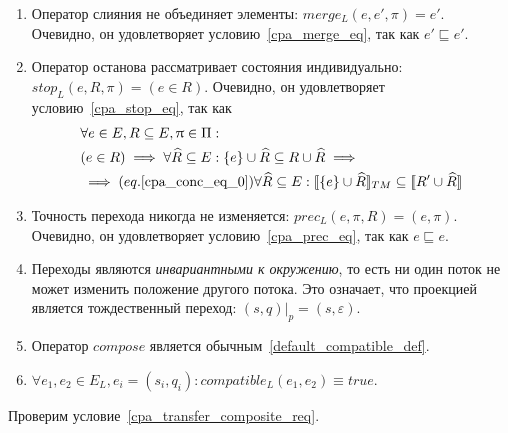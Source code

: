 \begin{enumerate}

\item Оператор слияния не объединяет элементы: $merge_L(e, e', \pi) = e'$. Очевидно, он удовлетворяет условию~\ref{cpa_merge_eq}, так как $e' \sqsubseteq e'$.

\item Оператор останова рассматривает состояния индивидуально: $stop_L(e, R, \pi) = (e \in R)$. Очевидно, он удовлетворяет условию~\ref{cpa_stop_eq}, так как
\begin{align}
&\forall e \in E, R \subseteq E, \uppi \in \Pi: \nonumber \\
& (e \in R) \implies \forall \widehat{R} \subseteq E: \{e\} \cup \widehat{R} \subseteq R \cup \widehat{R} \implies \nonumber \\
& \implies (eq.\ref{cpa_conc_eq_0}) \forall \widehat{R} \subseteq E: [\![ \{e\}\cup \widehat{R} ]\!]_{TM} \subseteq [\![ R' \cup \widehat{R} ]\!]
\end{align}

\item Точность перехода никогда не изменяется: $prec_L(e, \pi, R) = (e, \pi)$.
Очевидно, он удовлетворяет условию~\ref{cpa_prec_eq}, так как $e \sqsubseteq e$.

\item Переходы являются {\em инвариантными к окружению}, то есть ни один поток не может изменить положение другого потока.
Это означает, что проекцией является тождественный переход:
$(s, q)|_p = (s, \varepsilon)$.

\item Оператор $compose$ является обычным~\ref{default_compatible_def}.

\item $\forall e_1, e_2 \in E_L, e_i = (s_i, q_i):compatible_L(e_1,e_2) \equiv true$.

\end{enumerate}

Проверим условие~\ref{cpa_transfer_composite_req}.


